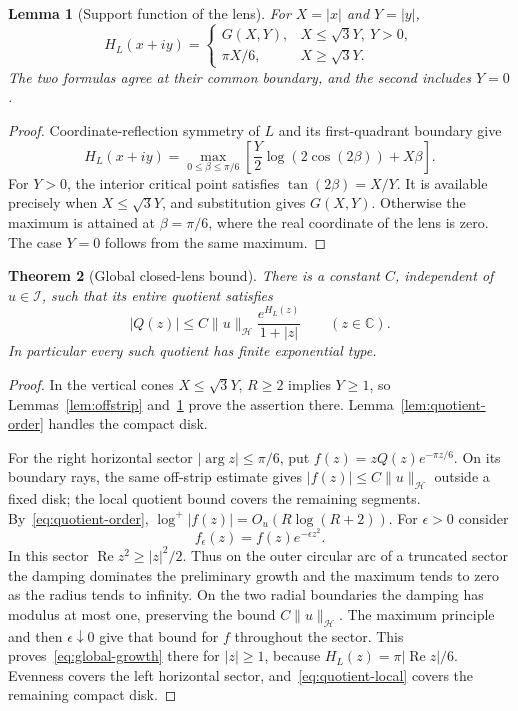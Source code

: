 \documentclass[11pt,a4paper]{article}
\numberwithin{equation}{section}
\newtheorem{theorem}{Theorem}[section]
\newtheorem{lemma}[theorem]{Lemma}
\theoremstyle{definition}
\theoremstyle{remark}
\newcommand{\C}{\mathbb C}
\newcommand{\Hh}{\mathcal H}
\newcommand{\Ii}{\mathcal I}
\newcommand{\norm}[1]{\lVert #1\rVert}
\begin{document}
\begin{lemma}[Support function of the lens]\label{lem:lens-support}
For $X=|x|$ and $Y=|y|$,
\begin{equation}\label{eq:lens-support}
 H_L(x+iy)=
 \begin{cases}
 G(X,Y),&X\le\sqrt3Y,\ Y>0,\\
 \pi X/6,&X\ge\sqrt3Y.
 \end{cases}
\end{equation}
The two formulas agree at their common boundary, and the second includes $Y=0$.
\end{lemma}
\begin{proof}
Coordinate-reflection symmetry of $L$ and its first-quadrant boundary give
\[
 H_L(x+iy)=\max_{0\le\beta\le\pi/6}
 \left[\frac Y2\log(2\cos(2\beta))+X\beta\right].
\]
For $Y>0$, the interior critical point satisfies $\tan(2\beta)=X/Y$. It is available precisely when $X\le\sqrt3Y$, and substitution gives $G(X,Y)$. Otherwise the maximum is attained at $\beta=\pi/6$, where the real coordinate of the lens is zero. The case $Y=0$ follows from the same maximum.
\end{proof}

\begin{theorem}[Global closed-lens bound]\label{thm:global-growth}
There is a constant $C$, independent of $u\in\Ii$, such that its entire quotient satisfies
\begin{equation}\label{eq:global-growth}
 |Q(z)|\le C\norm{u}_{\Hh}\frac{e^{H_L(z)}}{1+|z|}
 \qquad(z\in\C).
\end{equation}
In particular every such quotient has finite exponential type.
\end{theorem}
\begin{proof}
In the vertical cones $X\le\sqrt3Y$, $R\ge2$ implies $Y\ge1$, so Lemmas~\ref{lem:offstrip} and~\ref{lem:lens-support} prove the assertion there. Lemma~\ref{lem:quotient-order} handles the compact disk.

For the right horizontal sector $|\arg z|\le\pi/6$, put
$f(z)=zQ(z)e^{-\pi z/6}$. On its boundary rays, the same off-strip estimate gives
$|f(z)|\le C\norm{u}_{\Hh}$ outside a fixed disk; the local quotient bound covers the remaining segments. By~\eqref{eq:quotient-order},
$\log^+|f(z)|=O_u(R\log(R+2))$.
For $\epsilon>0$ consider
\[
 f_\epsilon(z)=f(z)e^{-\epsilon z^2}.
\]
In this sector $\operatorname{Re}z^2\ge|z|^2/2$. Thus on the outer circular arc of a truncated sector the damping dominates the preliminary growth and the maximum tends to zero as the radius tends to infinity. On the two radial boundaries the damping has modulus at most one, preserving the bound $C\norm{u}_{\Hh}$. The maximum principle and then $\epsilon\downarrow0$ give that bound for $f$ throughout the sector. This proves~\eqref{eq:global-growth} there for $|z|\ge1$, because $H_L(z)=\pi|\operatorname{Re}z|/6$. Evenness covers the left horizontal sector, and~\eqref{eq:quotient-local} covers the remaining compact disk.
\end{proof}
\end{document}
